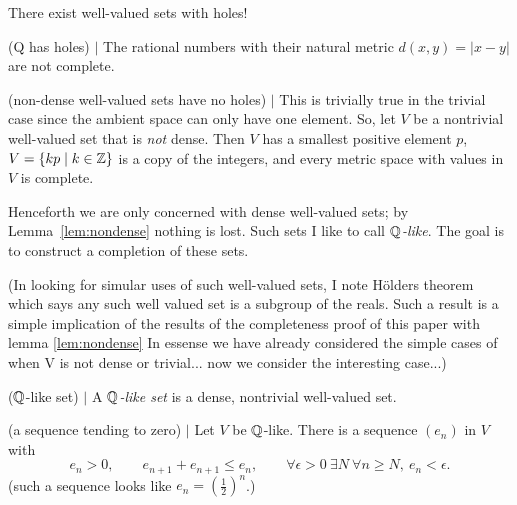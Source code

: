 There exist well-valued sets with holes!

\begin{theorem} (Q has holes) $\mid$ \label{thm:holes}
The rational numbers with their natural metric $d(x,y)=|x-y|$ are not
complete.
\end{theorem}

\begin{lemma} (non-dense well-valued sets have no holes) $\mid$
\label{lem:nondense}
This is trivially true in the trivial case since the ambient space can only have one element. So, let $V$ be a nontrivial well-valued set that is \emph{not} dense. Then $V$ has
a smallest positive element $p$, $V=\{kp\mid k\in\mathbb{Z}\}$ is a copy of the
integers, and every metric space with values in $V$ is complete.
\end{lemma}

Henceforth we are only concerned with dense well-valued sets; by
Lemma~\ref{lem:nondense} nothing is lost. Such sets I like to call
\emph{$\mathbb{Q}$-like}. The goal is to construct a completion of these sets. 

(In looking for simular uses of such well-valued sets, I note Hölders theorem which says any such well valued set is a subgroup of the reals. Such a result is a simple implication of the results of the completeness proof of this paper with lemma \ref{lem:nondense} In essense we have already considered the simple cases of when V is not dense or trivial... now we consider the interesting case...)

\begin{definition} ($\mathbb{Q}$-like set) $\mid$ \label{def:qlike}
A \emph{$\mathbb{Q}$-like set} is a dense, nontrivial well-valued set.
\end{definition}


\begin{lemma} (a sequence tending to zero) $\mid$ \label{lem:nullseq}
Let $V$ be $\mathbb{Q}$-like. There is a sequence $(e_n)$ in $V$ with
\[
e_n>0,\qquad e_{n+1}+e_{n+1}\le e_n,\qquad
\forall\epsilon>0\ \exists N\ \forall n\ge N,\ e_n<\epsilon .
\]
(such a sequence looks like $e_n=(\frac12)^n$.)
\end{lemma}